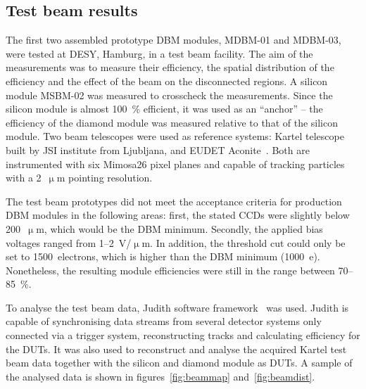 \subsection{Test beam results}
The first two assembled prototype DBM modules, MDBM-01 and MDBM-03, were tested at DESY, Hamburg, in a test beam facility. The aim of the measurements was to measure their efficiency, the spatial distribution of the efficiency and the effect of the beam on the disconnected regions. A silicon module MSBM-02 was measured to crosscheck the measurements. Since the silicon module is almost 100~\% efficient, it was used as an ``anchor'' -- the efficiency of the diamond module was measured relative to that of the silicon module. Two beam telescopes were used as reference systems: Kartel telescope~\cite{McGoldrick:1982209} built by JSI institute from Ljubljana, and EUDET Aconite~\cite{ACONI:00000}. Both are instrumented with six Mimosa26 pixel planes and capable of tracking particles with a 2~$\upmu$m pointing resolution.

The test beam prototypes did not meet the acceptance criteria for production DBM modules in the following areas: first, the stated CCDs were slightly below 200~$\upmu$m, which would be the DBM minimum. Secondly, the applied bias voltages ranged from 1--2~V/$\upmu$m. In addition, the threshold cut could only be set to 1500~electrons, which is higher than the DBM minimum (1000~e). Nonetheless, the resulting module efficiencies were still in the range between 70--85~\%.

To analyse the test beam data, Judith software framework~\cite{McGoldrick:1982209} was used. Judith is capable of synchronising data streams from several detector systems only connected via a trigger system, reconstructing tracks and calculating efficiency for the DUTs. It was also used to reconstruct and analyse the acquired Kartel test beam data together with the silicon and diamond module as DUTs. A sample of the analysed data is shown in figures~\ref{fig:beammap} and~\ref{fig:beamdist}. 


